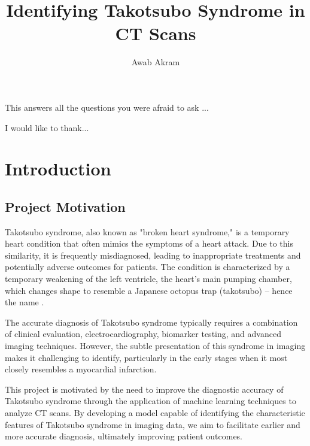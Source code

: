 \documentclass[12pt, BSc]{muthesis}
\begin{document}

\title{Identifying Takotsubo Syndrome in CT Scans}
    \author{Awab Akram}



\beforeabstract
{}
\abstracttitle
   This \expandafter{\@thesis} answers all the questions you were afraid to ask ...
\afterabstract

\abstracttitle
    I would like to thank...
\afterpreface


\chapter{Introduction}
\label{ch:intro}
\section{Project Motivation}
Takotsubo syndrome, also known as "broken heart syndrome," is a temporary heart condition that often mimics the symptoms of a heart attack. Due to this similarity, it is frequently misdiagnosed, leading to inappropriate treatments and potentially adverse outcomes for patients. The condition is characterized by a temporary weakening of the left ventricle, the heart's main pumping chamber, which changes shape to resemble a Japanese octopus trap (takotsubo) – hence the name \cite{GUPTA2018165}.

The accurate diagnosis of Takotsubo syndrome typically requires a combination of clinical evaluation, electrocardiography, biomarker testing, and advanced imaging techniques. However, the subtle presentation of this syndrome in imaging makes it challenging to identify, particularly in the early stages when it most closely resembles a myocardial infarction.

This project is motivated by the need to improve the diagnostic accuracy of Takotsubo syndrome through the application of machine learning techniques to analyze CT scans. By developing a model capable of identifying the characteristic features of Takotsubo syndrome in imaging data, we aim to facilitate earlier and more accurate diagnosis, ultimately improving patient outcomes.
\end{document}
